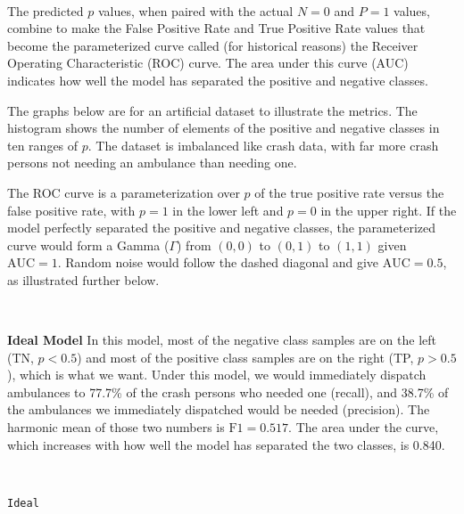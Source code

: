 \

The predicted $p$ values, when paired with the actual $N=0$ and $P=1$ values, combine to make the False Positive Rate and True Positive Rate values that become the parameterized curve called (for historical reasons) the Receiver Operating Characteristic (ROC) curve.  The area under this curve (AUC) indicates how well the model has separated the positive and negative classes.  

The graphs below are for an artificial dataset to illustrate the metrics.  The histogram shows the number of elements of the positive and negative classes in ten ranges of $p$.  The dataset is imbalanced like crash data, with far more crash persons not needing an ambulance than needing one.  

The ROC curve is a parameterization over $p$ of the true positive rate versus the false positive rate, with $p=1$ in the lower left and $p=0$ in the upper right.  If the model perfectly separated the positive and negative classes, the parameterized curve would form a Gamma ($\Gamma$) from $(0,0)$ to $(0,1)$ to $(1,1)$ given $\text{AUC} = 1$.  Random noise would follow the dashed diagonal and give $\text{AUC} = 0.5$, as illustrated further below.  

\

{\bf Ideal Model}  
In this model, most of the negative class samples are on the left (TN, $p<0.5$) and most of the positive class samples are on the right (TP, $p>0.5$), which is what we want.  Under this model, we would immediately dispatch ambulances to 77.7\% of the crash persons who needed one (recall), and 38.7\% of the ambulances we immediately dispatched would be needed (precision).  The harmonic mean of those two numbers is $\text{F1} = 0.517$.  The area under the curve, which increases with how well the model has separated the two classes, is 0.840.

\

\verb|Ideal|

